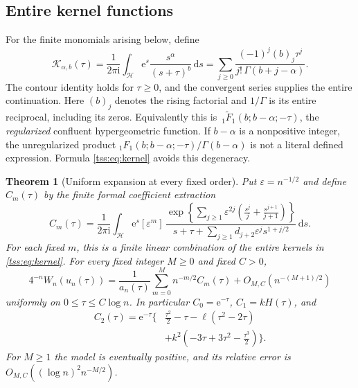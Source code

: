 \documentclass[11pt]{article}
\newtheorem{theorem}{Theorem}[section]
\theoremstyle{remark}\newtheorem{remark}[theorem]{Remark}
\theoremstyle{definition}\newtheorem{definition}[theorem]{Definition}
\newcommand{\ii}{\mathrm i}
\newcommand{\dd}{\mathrm d}
\newcommand{\e}{\mathrm e}
\newcommand{\HH}{\mathcal H}
\newcommand{\RegF}{\,{}_1\widetilde F_1}
\begin{document}
\subsection{Entire kernel functions}
For the finite monomials arising below, define
\begin{equation}\label{tss:eq:kernel}
\mathcal K_{\alpha,b}(\tau)
 =\frac1{2\pi\ii}\int_{\HH}\e^s\frac{s^\alpha}{(s+\tau)^b}\,\dd s
 =\sum_{j\geq0}\frac{(-1)^j(b)_j\tau^j}
                         {j!\,\Gamma(b+j-\alpha)}.
\end{equation}
The contour identity holds for $\tau\geq0$, and the convergent series supplies the entire continuation. Here $(b)_j$ denotes the rising factorial and $1/\Gamma$ is its entire reciprocal, including its zeros. Equivalently this is
$\RegF(b;b-\alpha;-\tau)$, the \emph{regularized} confluent hypergeometric function. If $b-\alpha$ is a nonpositive integer, the unregularized product
${}_1F_1(b;b-\alpha;-\tau)/\Gamma(b-\alpha)$ is not a literal defined expression. Formula \eqref{tss:eq:kernel} avoids this degeneracy.

\begin{theorem}[Uniform expansion at every fixed order]\label{tss:thm:allorders}
Put $\varepsilon=n^{-1/2}$ and define $C_m(\tau)$ by the finite formal coefficient extraction
\begin{equation}\label{tss:eq:generator}
C_m(\tau)=\frac1{2\pi\ii}\int_{\HH}\e^s[\varepsilon^m]\,
\frac{\displaystyle\exp\left\{\sum_{j\geq1}\varepsilon^{2j}
             \left(\frac{s^j}{j}+\frac{s^{j+1}}{j+1}\right)\right\}}
 {\displaystyle s+\tau+\sum_{j\geq1}d_{j+2}\varepsilon^j s^{1+j/2}}\,\dd s.
\end{equation}
For each fixed $m$, this is a finite linear combination of the entire kernels in \eqref{tss:eq:kernel}. For every fixed integer $M\geq0$ and fixed $C>0$,
\begin{equation}\label{tss:eq:uniformall}
4^{-n}W_n(u_n(\tau))
 =\frac1{a_n(\tau)}\sum_{m=0}^M n^{-m/2}C_m(\tau)
   +O_{M,C}(n^{-(M+1)/2})
\end{equation}
uniformly on $0\leq\tau\leq C\log n$. In particular $C_0=\e^{-\tau}$, $C_1=kH(\tau)$, and
\begin{equation}\label{tss:eq:C2}
\begin{split}
C_2(\tau)=\e^{-\tau}\biggl\{&\frac{\tau^2}{2}-\tau
  -\ell(\tau^2-2\tau)\\
 &+k^2\left(-3\tau+3\tau^2-\frac{\tau^3}{2}\right)\biggr\}.
\end{split}
\end{equation}
For $M\geq1$ the model is eventually positive, and its relative error is
$O_{M,C}((\log n)^2n^{-M/2})$.
\end{theorem}
\end{document}
